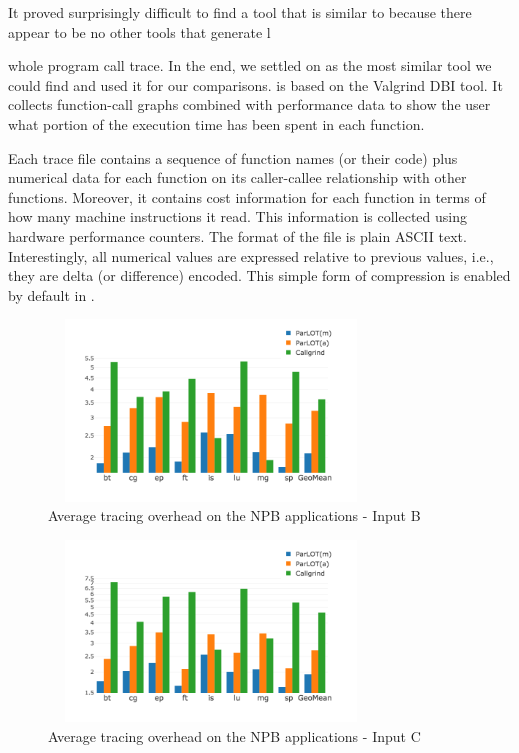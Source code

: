It proved surprisingly difficult to find a tool that is similar to \parlot because there appear to be no other tools that generate l{whole program call trace.
%
In the end, we settled on \callgrind as the most similar tool we could find and used it for our comparisons.
%
\callgrind is based on the Valgrind DBI tool.
%
It collects function-call graphs combined with performance data to show the user what portion of the execution time has been spent in each function.


Each \callgrind trace file contains a sequence of function names (or their code) plus numerical data for each function on its caller-callee relationship with other functions.
%
Moreover, it contains cost information for each function in terms of how many machine instructions it read.
%
This information is collected using hardware performance counters.
%
The format of the file is plain ASCII text.
%
Interestingly, all numerical values are expressed relative to previous values, i.e., they are delta (or difference) encoded.
%
This simple form of compression is enabled by default in \callgrind.


\begin{figure}[t]
\centering
\includegraphics[width=3.4in,height=1.9in]{figs.comet.newMed/comet_chartAvg_sd_B_p3_5.png}
\caption{Average tracing overhead on the NPB applications - Input B}
\label{comet_chartAvg_sd_B_p3_5}
\end{figure}

\begin{figure}[t]
\centering
\includegraphics[width=3.4in,height=1.9in]{figs.comet.newMed/comet_chartAvg_sd_C_p3_5.png}
\caption{ Average tracing overhead on the NPB applications - Input C}
\label{comet_chartAvg_sd_C_p3_5}
\end{figure}


}
